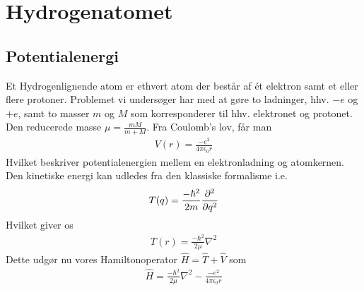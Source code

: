 \documentclass[12pt]{article}
\theoremstyle{definition}
\theoremstyle{remark}
\theoremstyle{definition}
\numberwithin{equation}{section}
\begin{document}
\section{Hydrogenatomet}
\subsection{Potentialenergi}
Et Hydrogenlignende atom er ethvert atom der består af ét elektron samt et eller flere protoner. Problemet vi undersøger har med at gøre to ladninger, hhv. $-e$ og $+e$, samt to masser $m$ og $M$ som korresponderer til hhv. elektronet og protonet. Den reducerede masse $\mu = \frac{mM}{m+M}$. Fra Coulomb's lov, får man
\begin{align}
    V(r) = \frac{-e^2}{4\pi \epsilon_0 r}
\end{align}
Hvilket beskriver potentialenergien mellem en elektronladning og atomkernen. Den kinetiske energi kan udledes fra den klassiske formalisme i.e.
\begin{align}
    T(q) = \frac{-\hbar^2}{2m}\pdv[2]{q} 
\end{align}
Hvilket giver os
\begin{align}
    T(r) = \frac{-\hbar^2}{2\mu}\nabla^2
\end{align}
Dette udgør nu vores Hamiltonoperator $\hat H = \hat T+\hat V$ som
\begin{align}
\label{hydrogenhamil}
    \hat H = \frac{-\hbar^2}{2\mu}\nabla^2 - \frac{-e^2}{4\pi \epsilon_0 r}
\end{align}
\end{document}
